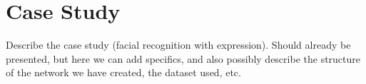 
\chapter{Case Study}

Describe the case study (facial recognition with expression).
Should already be presented, but here we can add specifics, and also possibly describe the structure of the network we have created, the dataset used, etc.

\cleardoublepage